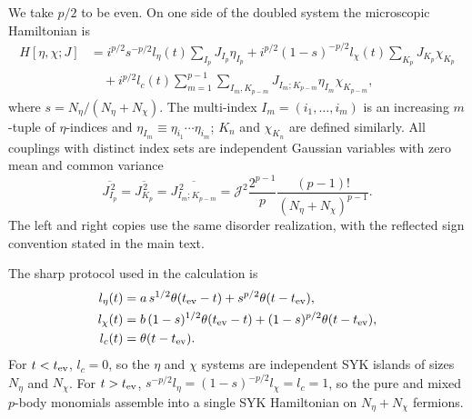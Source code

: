 \documentclass[pdflatex,sn-nature]{sn-jnl}
\begin{document}
We take \(p/2\) to be even. On one side of the doubled system the microscopic Hamiltonian is
\begin{equation}
\begin{aligned}
H[\eta,\chi;J]
&=i^{p/2}s^{-p/2}l_\eta(t)\sum_{I_p}J_{I_p}\eta_{I_p}
+i^{p/2}(1-s)^{-p/2}l_\chi(t)\sum_{K_p}J_{K_p}\chi_{K_p}\\
&\quad+i^{p/2}l_c(t)\sum_{m=1}^{p-1}\sum_{I_m,K_{p-m}}
J_{I_m;K_{p-m}}\eta_{I_m}\chi_{K_{p-m}},
\end{aligned}
\label{eq:methods-one-sided-H}
\end{equation}
where \(s=N_\eta/(N_\eta+N_\chi)\). The multi-index \(I_m=(i_1,\ldots,i_m)\) is an increasing \(m\)-tuple of \(\eta\)-indices and \(\eta_{I_m}\equiv\eta_{i_1}\cdots\eta_{i_m}\); \(K_n\) and \(\chi_{K_n}\) are defined similarly. All couplings with distinct index sets are independent Gaussian variables with zero mean and common variance
\begin{equation}
\overline{J_{I_p}^{\,2}}
=
\overline{J_{K_p}^{\,2}}
=
\overline{J_{I_m;K_{p-m}}^{\,2}}
=
\mathcal J^2\frac{2^{p-1}}{p}
\frac{(p-1)!}{(N_\eta+N_\chi)^{p-1}} .
\label{eq:methods-disorder}
\end{equation}
The left and right copies use the same disorder realization, with the reflected sign convention stated in the main text.

The sharp protocol used in the calculation is
\begin{equation}
\begin{aligned}
l_\eta(t)
&=
a\,s^{1/2}\theta(t_{\rm ev}-t)
+s^{p/2}\theta(t-t_{\rm ev}),
\\
l_\chi(t)
&=
b\,(1-s)^{1/2}\theta(t_{\rm ev}-t)
+(1-s)^{p/2}\theta(t-t_{\rm ev}),
\\
l_c(t)
&=
\theta(t-t_{\rm ev}) .
\end{aligned}
\label{eq:methods-l-protocol}
\end{equation}
For \(t<t_{\rm ev}\), \(l_c=0\), so the \(\eta\) and \(\chi\) systems are independent SYK islands of sizes \(N_\eta\) and \(N_\chi\). For \(t>t_{\rm ev}\), \(s^{-p/2}l_\eta=(1-s)^{-p/2}l_\chi=l_c=1\), so the pure and mixed \(p\)-body monomials assemble into a single SYK Hamiltonian on \(N_\eta+N_\chi\) fermions.
\end{document}

